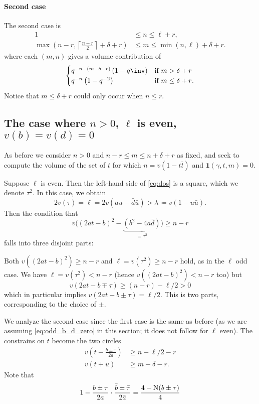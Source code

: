 \paragraph{Second case}
The second case is
\begin{equation}
  \begin{aligned}
    1 &\leq n \leq \ell + r, \\
    \max\left(n-r, \left\lceil \frac{n-r}{2} \right\rceil+\delta+r \right)
    &\leq m \leq \min(n,\ell)+\delta+r.
  \end{aligned}
  \label{eq:odd_range2}
\end{equation}
where each $(m,n)$ gives a volume contribution of
\[
  \begin{cases}
    q^{-n - (m-\delta-r)} \left( 1 - q\inv \right)
      & \text{if $m > \delta + r$} \\
    q^{-n} \left( 1 - q^{-2} \right)
      & \text{if $m \le \delta + r$}.
  \end{cases}
\]
Notice that $m \leq \delta + r$ could only occur when $n \leq r$.

\subsection{The case where $n > 0$, $\ell$ is even, $v(b)=v(d)=0$}
As before we consider $n > 0$ and $n-r \le m \le n+\delta+r$ as fixed,
and seek to compute the volume of the set of $t$
for which $n = v(1-t\bar t)$ and $\mathbf{1}(\gamma,t,m) = 0$.

Suppose $\ell$ is even.
Then the left-hand side of \eqref{eq:dos} is a square, which we denote $\tau^2$.
In this case, we obtain
\[ 2v(\tau) = \ell = 2v(au-\bar d\bar u) > \lambda \coloneqq v(1-u \bar u). \]
Then the condition that
\[ v\Big( (2at-b)^2 - \underbrace{(b^2-4a\bar d)}_{=\tau^2} \Big) \geq n-r \]
falls into three disjoint parts:
\begin{itemize}
  \ii Both $v\left( (2at-b)^2 \right) \geq n-r$ and $\ell = v(\tau^2) \geq n-r$ hold,
  as in the $\ell$ odd case.
  \ii We have $\ell = v(\tau^2) < n-r$ (hence $v\left( (2at-b)^2 \right) < n-r$ too) but
  \[ v(2at-b \mp \tau) \geq (n-r)-\ell/2 > 0 \]
  which in particular implies $v(2at-b \pm \tau) = \ell/2$.
  This is two parts, corresponding to the choice of $\pm$.
\end{itemize}
We analyze the second case since the first case is the same as before
(as we are assuming \eqref{eq:odd_b_d_zero} in this section;
it does not follow for $\ell$ even).
The constrains on $t$ become the two circles
\begin{align}
  v\left( t - \frac{b \pm \tau}{2a} \right) &\geq n - \ell/2 - r \\
  v(t+u) &\ge m - \delta - r.
\end{align}
Note that
\[ 1 - \frac{b \pm \tau}{2a} \cdot \frac{\bar b \pm \bar \tau}{2\bar a}
= \frac{4 - \operatorname{N}(b \pm \tau)}{4} \]

